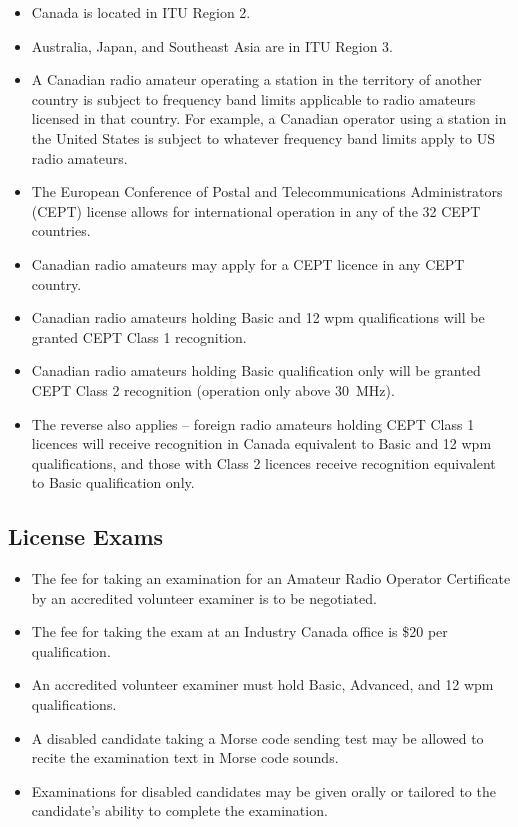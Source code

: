 \documentclass[letterpaper,12pt]{scrartcl}
\begin{document}
\begin{itemize}
\item Canada is located in ITU Region 2.
\item Australia, Japan, and Southeast Asia are in ITU Region 3.
\item A Canadian radio amateur operating a station in the territory of another country is subject to
frequency band limits applicable to radio amateurs licensed in that country.
For example, a Canadian operator using a station in the United States is subject to
whatever frequency band limits apply to US radio amateurs.
\item The European Conference of Postal and Telecommunications Administrators (CEPT) license allows for international operation in any of the 32 CEPT countries.
\item Canadian radio amateurs may apply for a CEPT licence in any CEPT country.
\item Canadian radio amateurs holding Basic and 12 wpm qualifications will be granted CEPT Class 1 recognition.
\item Canadian radio amateurs holding Basic qualification only will be granted CEPT Class 2 recognition (operation only above 30~MHz).
\item The reverse also applies -- foreign radio amateurs holding CEPT Class 1 licences will receive recognition in Canada equivalent to Basic and 12 wpm qualifications,
and those with Class 2 licences receive recognition equivalent to Basic qualification only.
\end{itemize}

\subsection{License Exams}

\begin{itemize}
\item The fee for taking an examination for an Amateur Radio Operator Certificate by an accredited volunteer examiner is to be negotiated.
\item The fee for taking the exam at an Industry Canada office is \$20 per qualification.
\item An accredited volunteer examiner must hold Basic, Advanced, and 12 wpm qualifications.
\item A disabled candidate taking a Morse code sending test may be allowed to recite the examination text in Morse code sounds.
\item Examinations for disabled candidates may be given orally or tailored to the candidate's ability to complete the examination.
\end{itemize}
\end{document}
